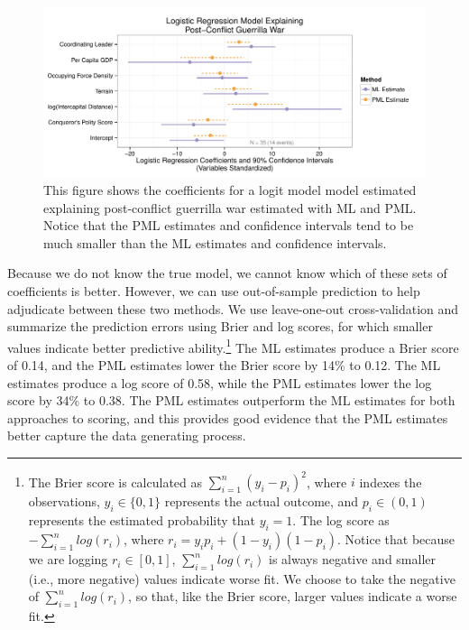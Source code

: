 \documentclass[12pt]{article}
\begin{document}
\begin{appendix}
\begin{figure}[h]
\begin{center}
\includegraphics[width = \textwidth]{figs/weisiger-coefs.pdf}
\caption{This figure shows the coefficients for a logit model model estimated explaining post-conflict guerrilla war estimated with ML and PML.
Notice that the PML estimates and confidence intervals tend to be much smaller than the ML estimates and confidence intervals.}\label{fig:weisiger-coefs}
\end{center}
\end{figure}

Because we do not know the true model, we cannot know which of these sets of coefficients is better.
However, we can use out-of-sample prediction to help adjudicate between these two methods.
We use leave-one-out cross-validation and summarize the prediction errors using Brier and log scores, for which smaller values indicate better predictive ability.\footnote{The Brier score is calculated as $\sum_{i = 1}^n (y_i - p_i)^2$, where $i$ indexes the observations, $y_i \in \{0, 1\}$ represents the actual outcome, and $p_i \in (0, 1)$ represents the estimated probability that $y_i = 1$.
The log score as $-\sum_{i = 1}^n log(r_i)$, where $r_i = y_i p_i + (1 - y_i)(1 - p_i)$.
Notice that because we are logging $r_i \in [0, 1]$, $\sum_{i = 1}^n log(r_i)$ is always negative and smaller (i.e., more negative) values indicate worse fit.
We choose to take the negative of $\sum_{i = 1}^n log(r_i)$, so that, like the Brier score, larger values indicate a worse fit.}
The ML estimates produce a Brier score of 0.14, and the PML estimates lower the Brier score by 14\% to 0.12.
The ML estimates produce a log score of 0.58, while the PML estimates lower the log score by 34\% to 0.38.
The PML estimates outperform the ML estimates for both approaches to scoring, and
this provides good evidence that the PML estimates better capture the data generating process.


\end{appendix}
\end{document}
